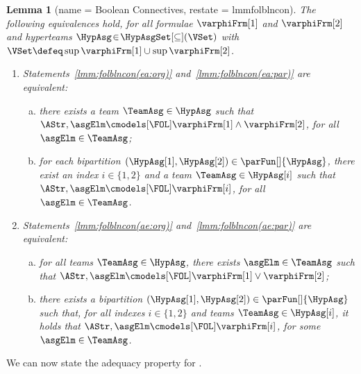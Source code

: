 \documentclass[authoryear]{elsarticle}
\newtheorem{lemma}{Lemma}
\begin{document}
\begin{lemma}[name = \FOL Boolean Connectives, restate = lmmfolblncon]
  \label{lmm:folblncon}
  The following equivalences hold, for all \FOL formulae $\varphiFrm[1]$ and
  $\varphiFrm[2]$ and hyperteams $\HypAsg \!\in\! \HypAsgSet[\subseteq](\VSet)$
  with $\VSet \defeq \sup{\varphiFrm[1]} \cup \sup{\varphiFrm[2]}$.
  \begin{enumerate}[1)]
    \item\label{lmm:folblncon(ea)}
      Statements~\ref{lmm:folblncon(ea:org)} and~\ref{lmm:folblncon(ea:par)} are
      equivalent:
      \begin{enumerate}[a)]
        \item\label{lmm:folblncon(ea:org)}
          there exists a team $\TeamAsg \in \HypAsg$ such that $\AStr, \asgElm
          \cmodels[\FOL] \varphiFrm[1] \wedge \varphiFrm[2]$, for all $\asgElm
          \in \TeamAsg$;
        \item\label{lmm:folblncon(ea:par)}
          for each bipartition $(\HypAsg[1], \HypAsg[2]) \in
          \parFun[]{\HypAsg}$, there exist an index $i \in \{ 1, 2 \}$ and a
          team $\TeamAsg \in \HypAsg[i]$ such that $\AStr, \asgElm
          \cmodels[\FOL] \varphiFrm[i]$, for all $\asgElm \in \TeamAsg$.
      \end{enumerate}
    \item\label{lmm:folblncon(ae)}
      Statements~\ref{lmm:folblncon(ae:org)} and~\ref{lmm:folblncon(ae:par)} are
      equivalent:
      \begin{enumerate}[a)]
        \item\label{lmm:folblncon(ae:org)}
          for all teams $\TeamAsg \in \HypAsg$, there exists $\asgElm \in
          \TeamAsg$ such that $\AStr, \asgElm \cmodels[\FOL] \varphiFrm[1] \vee
          \varphiFrm[2]$;
        \item\label{lmm:folblncon(ae:par)}
          there exists a bipartition $(\HypAsg[1], \HypAsg[2]) \in
          \parFun[]{\HypAsg}$ such that, for all indexes $i \in \{ 1, 2 \}$ and
          teams $\TeamAsg \in \HypAsg[i]$, it holds that $\AStr, \asgElm
          \cmodels[\FOL] \varphiFrm[i]$, for some $\asgElm \in \TeamAsg$.
      \end{enumerate}
  \end{enumerate}
\end{lemma}

We can now state the \FOL adequacy property for \ADIF.
\end{document}
